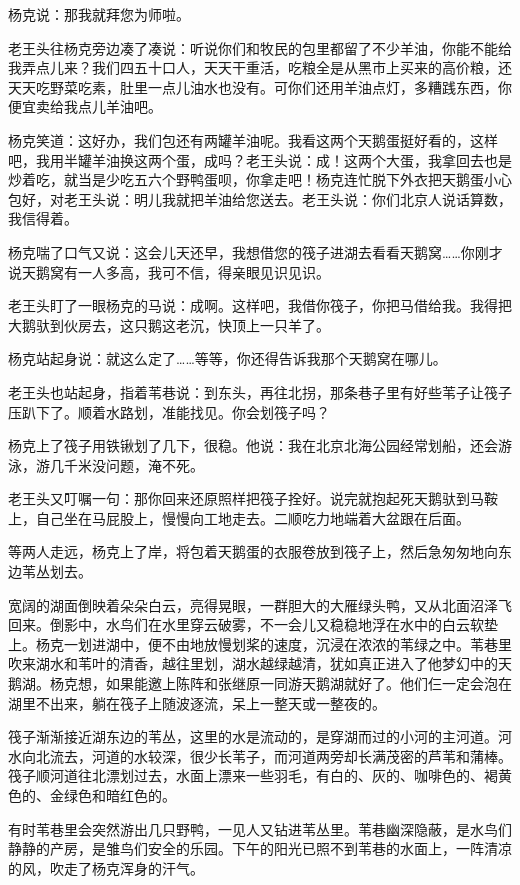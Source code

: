 \par 杨克说：那我就拜您为师啦。
\par 老王头往杨克旁边凑了凑说：听说你们和牧民的包里都留了不少羊油，你能不能给我弄点儿来？我们四五十口人，天天干重活，吃粮全是从黑市上买来的高价粮，还天天吃野菜吃素，肚里一点儿油水也没有。可你们还用羊油点灯，多糟践东西，你便宜卖给我点儿羊油吧。
\par 杨克笑道：这好办，我们包还有两罐羊油呢。我看这两个天鹅蛋挺好看的，这样吧，我用半罐羊油换这两个蛋，成吗？老王头说：成！这两个大蛋，我拿回去也是炒着吃，就当是少吃五六个野鸭蛋呗，你拿走吧！杨克连忙脱下外衣把天鹅蛋小心包好，对老王头说：明儿我就把羊油给您送去。老王头说：你们北京人说话算数，我信得着。
\par 杨克喘了口气又说：这会儿天还早，我想借您的筏子进湖去看看天鹅窝……你刚才说天鹅窝有一人多高，我可不信，得亲眼见识见识。
\par 老王头盯了一眼杨克的马说：成啊。这样吧，我借你筏子，你把马借给我。我得把大鹅驮到伙房去，这只鹅这老沉，快顶上一只羊了。
\par 杨克站起身说：就这么定了……等等，你还得告诉我那个天鹅窝在哪儿。
\par 老王头也站起身，指着苇巷说：到东头，再往北拐，那条巷子里有好些苇子让筏子压趴下了。顺着水路划，准能找见。你会划筏子吗？
\par 杨克上了筏子用铁锹划了几下，很稳。他说：我在北京北海公园经常划船，还会游泳，游几千米没问题，淹不死。
\par 老王头又叮嘱一句：那你回来还原照样把筏子拴好。说完就抱起死天鹅驮到马鞍上，自己坐在马屁股上，慢慢向工地走去。二顺吃力地端着大盆跟在后面。
\par 等两人走远，杨克上了岸，将包着天鹅蛋的衣服卷放到筏子上，然后急匆匆地向东边苇丛划去。
\par 
\par 宽阔的湖面倒映着朵朵白云，亮得晃眼，一群胆大的大雁绿头鸭，又从北面沼泽飞回来。倒影中，水鸟们在水里穿云破雾，不一会儿又稳稳地浮在水中的白云软垫上。杨克一划进湖中，便不由地放慢划桨的速度，沉浸在浓浓的苇绿之中。苇巷里吹来湖水和苇叶的清香，越往里划，湖水越绿越清，犹如真正进入了他梦幻中的天鹅湖。杨克想，如果能邀上陈阵和张继原一同游天鹅湖就好了。他们仨一定会泡在湖里不出来，躺在筏子上随波逐流，呆上一整天或一整夜的。
\par 筏子渐渐接近湖东边的苇丛，这里的水是流动的，是穿湖而过的小河的主河道。河水向北流去，河道的水较深，很少长苇子，而河道两旁却长满茂密的芦苇和蒲棒。筏子顺河道往北漂划过去，水面上漂来一些羽毛，有白的、灰的、咖啡色的、褐黄色的、金绿色和暗红色的。
\par 有时苇巷里会突然游出几只野鸭，一见人又钻进苇丛里。苇巷幽深隐蔽，是水鸟们静静的产房，是雏鸟们安全的乐园。下午的阳光已照不到苇巷的水面上，一阵清凉的风，吹走了杨克浑身的汗气。

